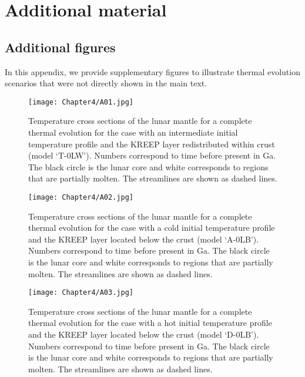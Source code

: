 \chapter{Additional material}
\label{chap:A2}

\section{Additional figures}

In this appendix, we provide supplementary figures to illustrate thermal evolution scenarios that
were not directly shown in the main text.

\begin{figure}\begin{center}
\texttt{[image: Chapter4/A01.jpg]}
\caption{Temperature cross sections of the lunar mantle for a complete thermal evolution for the
case with an intermediate initial temperature profile and the KREEP layer redistributed within crust
(model `T-0LW'). Numbers correspond to time before present in Ga. The black circle is the lunar core
and white corresponds to regions that are partially molten. The streamlines are shown as dashed
lines.} \label{fig:A1} \end{center} \end{figure}

\begin{figure}\begin{center}
\texttt{[image: Chapter4/A02.jpg]}
\caption{Temperature cross sections of the lunar mantle for a complete thermal evolution for the
case with a cold initial temperature profile and the KREEP layer located below the crust
(model `A-0LB'). Numbers correspond to time before present in Ga. The black circle is the lunar core
and white corresponds to regions that are partially molten. The streamlines are shown as dashed
lines.} \label{fig:A2} \end{center} \end{figure}

\begin{figure}\begin{center}
\texttt{[image: Chapter4/A03.jpg]}
\caption{Temperature cross sections of the lunar mantle for a complete thermal evolution for the
case with a hot initial temperature profile and the KREEP layer located below the crust
(model `D-0LB'). Numbers correspond to time before present in Ga. The black circle is the lunar core
and white corresponds to regions that are partially molten. The streamlines are shown as dashed
lines.}\label{fig:A3}  \end{center} \end{figure}

